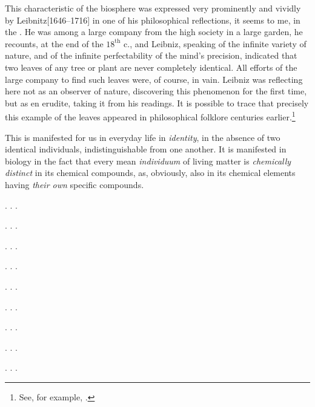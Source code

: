 This characteristic of the biosphere was expressed very prominently and vividly
by Leibnitz[1646--1716] in one of his philosophical reflections, it seems to
me, in the \nocite{leibnitz1985theodicy,
leibnitz1900oeuvres-v2}.  He was among a large company from the high society in
a large garden, he recounts, at the end of the $18^\mathrm{th}$ c., and
Leibniz, speaking of the infinite variety of nature, and of the infinite
perfectability of the mind's precision,
indicated that two leaves of any tree or plant are never completely identical.
All efforts of the large company to find such leaves were, of course, in vain.
Leibniz was reflecting here not as an observer of nature, discovering this
phenomenon for the first time, but as en erudite, taking it from his readings.
It is possible to trace that precisely this example of the leaves appeared in
philosophical folklore centuries earlier.\footnote{
	See, for example, \cite[кн.~2,
	с.~54]{carus1913prirode}\nocite{carus1936prirode, carus1851nature}.}

This is manifested for us in everyday life in
\emph{identity}, in the absence of two identical
individuals, indistinguishable from one another.  It is manifested in biology
in the fact that every mean \emph{individuum} of living
matter is \emph{chemically distinct} in its chemical compounds, as, obviously,
also in its chemical elements having \emph{their own} specific compounds.


\Section %

. . .

\Section \label{sec:6} %

. . .

\Section %

. . .

\Section %

. . .

\Section %

. . .

\Section %

. . .

\Section %

. . .

\Section %

. . .

\Section %

. . .
